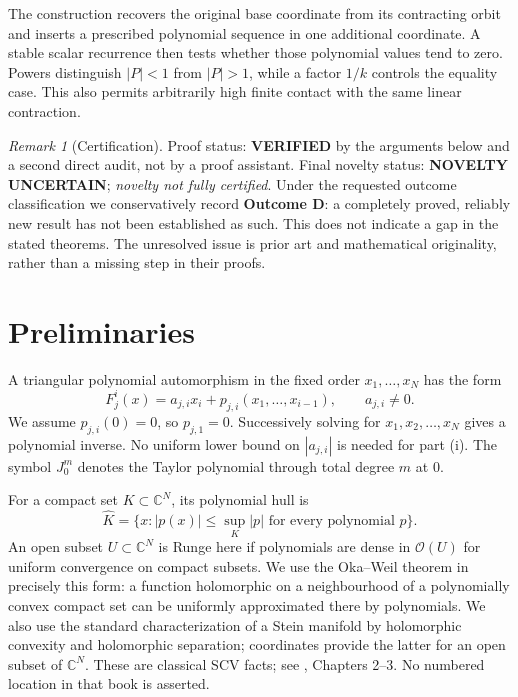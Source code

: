 \documentclass[12pt]{amsart}
\theoremstyle{definition}
\theoremstyle{remark}
\newtheorem{rem}[thm]{Remark}
\numberwithin{equation}{section}
\newcommand{\C}{\mathbb{C}}
\begin{document}
The construction recovers the original base coordinate from its contracting orbit and inserts a prescribed polynomial sequence in one additional coordinate. A stable scalar recurrence then tests whether those polynomial values tend to zero. Powers distinguish $|P|<1$ from $|P|>1$, while a factor $1/k$ controls the equality case. This also permits arbitrarily high finite contact with the same linear contraction.

\begin{rem}[Certification]\label{rem:status-en}
Proof status: \textbf{VERIFIED} by the arguments below and a second direct audit, not by a proof assistant. Final novelty status: \textbf{NOVELTY UNCERTAIN}; \emph{novelty not fully certified}. Under the requested outcome classification we conservatively record \textbf{Outcome D}: a completely proved, reliably new result has not been established as such. This does not indicate a gap in the stated theorems. The unresolved issue is prior art and mathematical originality, rather than a missing step in their proofs.
\end{rem}

\section{Preliminaries}
A triangular polynomial automorphism in the fixed order $x_1,\ldots,x_N$ has the form
\begin{equation}\label{eq:triangular-en}
F_j^i(x)=a_{j,i}x_i+p_{j,i}(x_1,\ldots,x_{i-1}),
\qquad a_{j,i}\ne0.
\end{equation}
We assume $p_{j,i}(0)=0$, so $p_{j,1}=0$. Successively solving for $x_1,x_2,\ldots,x_N$ gives a polynomial inverse. No uniform lower bound on $|a_{j,i}|$ is needed for part (i). The symbol $J_0^m$ denotes the Taylor polynomial through total degree $m$ at $0$.

For a compact set $K\subset\C^N$, its polynomial hull is
\[
\widehat K=\{x: |p(x)|\leq\sup_K|p|\text{ for every polynomial }p\}.
\]
An open subset $U\subset\C^N$ is Runge here if polynomials are dense in $\mathcal O(U)$ for uniform convergence on compact subsets. We use the Oka--Weil theorem in precisely this form: a function holomorphic on a neighbourhood of a polynomially convex compact set can be uniformly approximated there by polynomials. We also use the standard characterization of a Stein manifold by holomorphic convexity and holomorphic separation; coordinates provide the latter for an open subset of $\C^N$. These are classical SCV facts; see \cite{Forst-en}, Chapters 2--3. No numbered location in that book is asserted.
\end{document}
